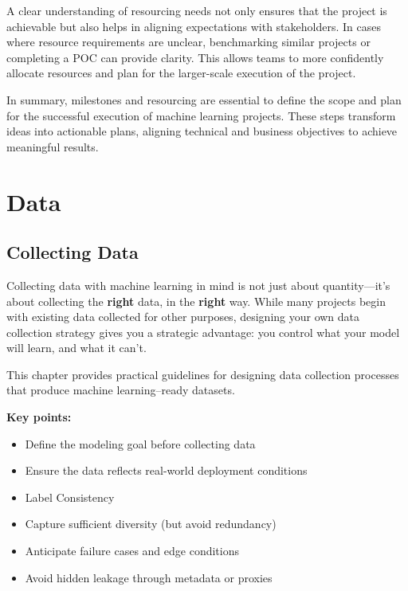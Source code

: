 \documentclass[12pt,openany]{book}
\begin{document}
A clear understanding of resourcing needs not only ensures that the project is achievable but also helps in aligning expectations with stakeholders. In cases where resource requirements are unclear, benchmarking similar projects or completing a POC can provide clarity. This allows teams to more confidently allocate resources and plan for the larger-scale execution of the project. \newline

In summary, milestones and resourcing are essential to define the scope and plan for the successful execution of machine learning projects. These steps transform ideas into actionable plans, aligning technical and business objectives to achieve meaningful results.




\part{Data}


\chapter{Collecting Data}

Collecting data with machine learning in mind is not just about quantity—it's about collecting the \textbf{right} data, in the \textbf{right} way. While many projects begin with existing data collected for other purposes, designing your own data collection strategy gives you a strategic advantage: you control what your model will learn, and what it can’t.
\newline

This chapter provides practical guidelines for designing data collection processes that produce machine learning–ready datasets.

\textbf{Key points:}
\begin{itemize}
    \item Define the modeling goal before collecting data
    \item Ensure the data reflects real-world deployment conditions
    \item Label Consistency
    \item Capture sufficient diversity (but avoid redundancy)
    \item Anticipate failure cases and edge conditions
    \item Avoid hidden leakage through metadata or proxies
\end{itemize}
\end{document}
